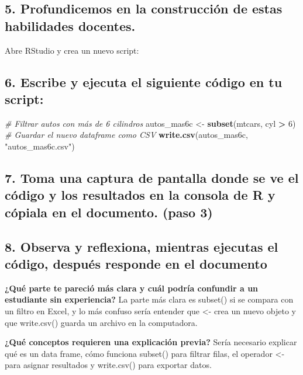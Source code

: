 \documentclass[
]{article}
\newenvironment{Shaded}{\begin{snugshade}}{\end{snugshade}}
\newcommand{\CommentTok}[1]{\textcolor[rgb]{0.56,0.35,0.01}{\textit{#1}}}
\newcommand{\DecValTok}[1]{\textcolor[rgb]{0.00,0.00,0.81}{#1}}
\newcommand{\FunctionTok}[1]{\textcolor[rgb]{0.13,0.29,0.53}{\textbf{#1}}}
\newcommand{\NormalTok}[1]{#1}
\newcommand{\OtherTok}[1]{\textcolor[rgb]{0.56,0.35,0.01}{#1}}
\newcommand{\SpecialCharTok}[1]{\textcolor[rgb]{0.81,0.36,0.00}{\textbf{#1}}}
\newcommand{\StringTok}[1]{\textcolor[rgb]{0.31,0.60,0.02}{#1}}
\begin{document}
\subsection{5. Profundicemos en la construcción de estas habilidades
docentes.}\label{profundicemos-en-la-construcciuxf3n-de-estas-habilidades-docentes.}

Abre RStudio y crea un nuevo script:

\subsection{6. Escribe y ejecuta el siguiente código en tu
script:}\label{escribe-y-ejecuta-el-siguiente-cuxf3digo-en-tu-script}

\begin{Shaded}
\begin{Highlighting}[]
\CommentTok{\# Filtrar autos con más de 6 cilindros}
\NormalTok{autos\_mas6c }\OtherTok{\textless{}{-}} \FunctionTok{subset}\NormalTok{(mtcars, cyl }\SpecialCharTok{\textgreater{}} \DecValTok{6}\NormalTok{)}
\CommentTok{\# Guardar el nuevo dataframe como CSV}
\FunctionTok{write.csv}\NormalTok{(autos\_mas6c, }\StringTok{"autos\_mas6c.csv"}\NormalTok{)}
\end{Highlighting}
\end{Shaded}

\subsection{7. Toma una captura de pantalla donde se ve el código y los
resultados en la consola de R y cópiala en el documento. (paso
3)}\label{toma-una-captura-de-pantalla-donde-se-ve-el-cuxf3digo-y-los-resultados-en-la-consola-de-r-y-cuxf3piala-en-el-documento.-paso-3}

\subsection{8. Observa y reflexiona, mientras ejecutas el código,
después responde en el
documento}\label{observa-y-reflexiona-mientras-ejecutas-el-cuxf3digo-despuuxe9s-responde-en-el-documento}

\textbf{¿Qué parte te pareció más clara y cuál podría confundir a un
estudiante sin experiencia?} La parte más clara es subset() si se
compara con un filtro en Excel, y lo más confuso sería entender que
\textless- crea un nuevo objeto y que write.csv() guarda un archivo en
la computadora.

\textbf{¿Qué conceptos requieren una explicación previa?} Sería
necesario explicar qué es un data frame, cómo funciona subset() para
filtrar filas, el operador \textless- para asignar resultados y
write.csv() para exportar datos.
\end{document}

